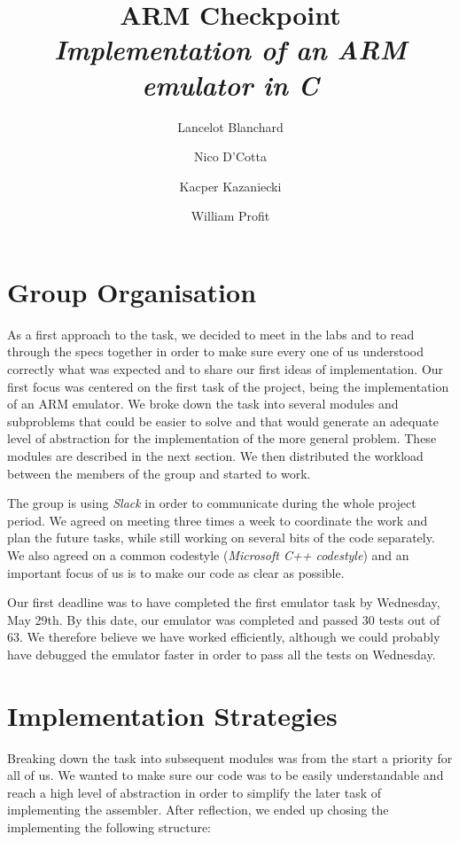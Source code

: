 \documentclass[11pt]{article}
\begin{document}
\title{
  ARM Checkpoint \\
  \large \emph{Implementation of an ARM emulator in C}}
\author{Lancelot Blanchard \and Nico D'Cotta \and Kacper Kazaniecki \and William Profit}

\maketitle

\section{Group Organisation}

As a first approach to the task, we decided to meet in the labs and to read through the specs
together in order to make sure every one of us understood correctly what was expected and to share 
our first ideas of implementation. Our first focus was centered on the first task of the project, 
being the implementation of an ARM emulator. We broke down the task into several modules and subproblems 
that could be easier to solve and that would generate an adequate level of abstraction for the implementation of 
the more general problem. These modules are described in the next section. We then distributed the workload 
between the members of the group and started to work.

The group is using \emph{Slack} in order to communicate during the whole project period. We agreed on meeting 
three times a week to coordinate the work and plan the future tasks, while still working on several bits of the 
code separately. We also agreed on a common codestyle (\emph{Microsoft C++ codestyle}) and an important focus of us 
is to make our code as clear as possible.

Our first deadline was to have completed the first emulator task by Wednesday, May 29th. By this date, our emulator was 
completed and passed 30 tests out of 63. We therefore believe we have worked efficiently, although we could probably have 
debugged the emulator faster in order to pass all the tests on Wednesday. 

\section{Implementation Strategies}

Breaking down the task into subsequent modules was from the start a priority for all of us. We wanted to make sure 
our code was to be easily understandable and reach a high level of abstraction in order to simplify the later task 
of implementing the assembler. After reflection, we ended up chosing the implementing the following structure:  
\end{document}
